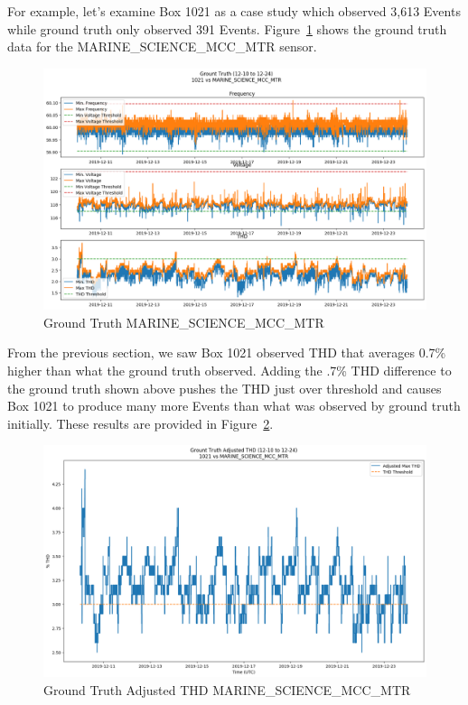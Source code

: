 For example, let's examine Box 1021 as a case study which observed 3,613 Events while ground truth only observed 391 Events. Figure~\ref{fig:gt_all_msb} shows the ground truth data for the MARINE\_SCIENCE\_MCC\_MTR sensor.

\begin{figure}[H]
    \centering
    \includegraphics[width=\linewidth]{figures/gt_all_1021_MARINE_SCIENCE_MCC_MTR.png}
    \caption{Ground Truth MARINE\_SCIENCE\_MCC\_MTR}
    \label{fig:gt_all_msb}
\end{figure}

From the previous section, we saw Box 1021 observed THD that averages 0.7\% higher than what the ground truth observed. Adding the .7\% THD difference to the ground truth shown above pushes the THD just over threshold and causes Box 1021 to produce many more Events than what was observed by ground truth initially. These results are provided in Figure~\ref{fig:gt_adj_msb}.

\begin{figure}[H]
    \centering
    \includegraphics[width=\linewidth]{figures/gt_adj_1021_MARINE_SCIENCE_MCC_MTR.png}
    \caption{Ground Truth Adjusted THD MARINE\_SCIENCE\_MCC\_MTR}
    \label{fig:gt_adj_msb}
\end{figure}

